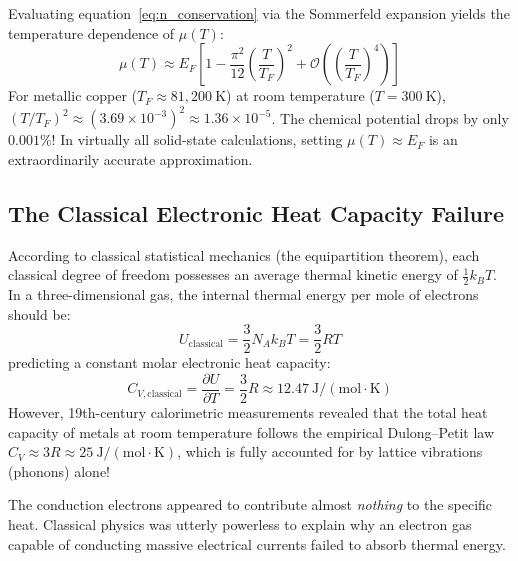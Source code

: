 \documentclass[11pt,a4paper]{article}
\begin{document}
Evaluating equation~\eqref{eq:n_conservation} via the Sommerfeld expansion yields the temperature dependence of $\mu(T)$:
\begin{equation}
\boxed{\mu(T) \approx E_F \left[ 1 - \frac{\pi^2}{12}\left(\frac{T}{T_F}\right)^2 + \mathcal{O}\left(\left(\frac{T}{T_F}\right)^4\right) \right]}
\label{eq:chemical_potential_T}
\end{equation}
For metallic copper ($T_F \approx 81{,}200\ \mathrm{K}$) at room temperature ($T = 300\ \mathrm{K}$), $(T/T_F)^2 \approx (3.69 \times 10^{-3})^2 \approx 1.36 \times 10^{-5}$. The chemical potential drops by only $0.001\%$! In virtually all solid-state calculations, setting $\mu(T) \approx E_F$ is an extraordinarily accurate approximation.

\subsection{The Classical Electronic Heat Capacity Failure}
According to classical statistical mechanics (the equipartition theorem), each classical degree of freedom possesses an average thermal kinetic energy of $\frac{1}{2}k_B T$. In a three-dimensional gas, the internal thermal energy per mole of electrons should be:
\begin{equation}
U_{\mathrm{classical}} = \frac{3}{2}N_A k_B T = \frac{3}{2}R T
\end{equation}
predicting a constant molar electronic heat capacity:
\begin{equation}
C_{V,\mathrm{classical}} = \frac{\partial U}{\partial T} = \frac{3}{2}R \approx 12.47\ \mathrm{J/(mol\cdot K)}
\label{eq:classical_cv}
\end{equation}
However, 19th-century calorimetric measurements revealed that the total heat capacity of metals at room temperature follows the empirical Dulong--Petit law $C_V \approx 3R \approx 25\ \mathrm{J/(mol\cdot K)}$, which is fully accounted for by lattice vibrations (phonons) alone! 

The conduction electrons appeared to contribute almost \emph{nothing} to the specific heat. Classical physics was utterly powerless to explain why an electron gas capable of conducting massive electrical currents failed to absorb thermal energy.
\end{document}
